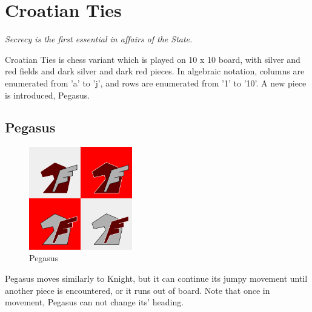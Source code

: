 \documentclass[a5paper,12pt,draft]{book} %
\begin{document}
\clearpage

\chapter*{Croatian Ties}

\begin{flushright}
\parbox{0.7\textwidth}{
\emph{Secrecy is the first essential in affairs of the State. \\
 } }
\end{flushright}

\noindent
Croatian Ties is chess variant which is played on 10 x 10 board,
with silver and red fields and dark silver and dark red pieces.
In algebraic notation, columns are enumerated from 'a' to 'j',
and rows are enumerated from '1' to '10'. A new piece is
introduced, Pegasus.

\clearpage

\section*{Pegasus}

\noindent
\begin{figure}
\includegraphics[width=0.4\textwidth, keepaspectratio=true]{../gfx/pieces/07_pegasus.png}
\caption{Pegasus}
\label{fig:pegasus}
\end{figure}
Pegasus moves similarly to Knight, but it can continue its jumpy movement
until another piece is encountered, or it runs out of board. Note that once
in movement, Pegasus can not change its' heading.
\end{document}
